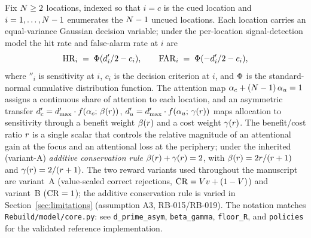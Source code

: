 Fix $N \ge 2$ locations, indexed so that $i = c$ is the cued
location and $i = 1, \dots, N-1$ enumerates the $N - 1$
uncued locations. Each location carries an equal-variance Gaussian
decision variable; under the per-location signal-detection model the
hit rate and false-alarm rate at $i$ are
\begin{equation}
  \mathrm{HR}_i \;=\; \Phi(d'_i/2 - c_i),
  \qquad
  \mathrm{FAR}_i \;=\; \Phi(-d'_i/2 - c_i),
  \label{eq:sdt-marginal}
\end{equation}
where $\dprime_i$ is sensitivity at $i$, $c_i$ is the decision
criterion at $i$, and $\Phi$ is the standard-normal cumulative
distribution function. The attention map
$\alpha_c + (N - 1)\,\alpha_u = 1$ assigns a continuous
share of attention to each location, and an asymmetric transfer
$d'_c = d'_{\max} \cdot f(\alpha_c;\, \beta(r))$,
$d'_u = d'_{\max} \cdot f(\alpha_u;\, \gamma(r))$
maps allocation to sensitivity through a benefit weight
$\beta(r)$ and a cost weight $\gamma(r)$. The
benefit/cost ratio $r$ is a single scalar that controls the
relative magnitude of an attentional gain at the focus and an
attentional loss at the periphery; under the inherited (variant-A)
\emph{additive conservation rule}
$\beta(r) + \gamma(r) = 2$, with
$\beta(r) = 2r/(r + 1)$ and
$\gamma(r) = 2/(r + 1)$. The two reward variants used
throughout the manuscript are variant~A (value-scaled correct
rejections, $\mathrm{CR} = V v + (1 - V)$) and variant~B
($\mathrm{CR} = 1$); the additive conservation rule is varied in
Section~\ref{sec:limitations} (assumption A3, RB-015/RB-019). The
notation matches \texttt{Rebuild/model/core.py}: see
\texttt{d\_prime\_asym}, \texttt{beta\_gamma}, \texttt{floor\_R}, and
\texttt{policies} for the validated reference implementation.

